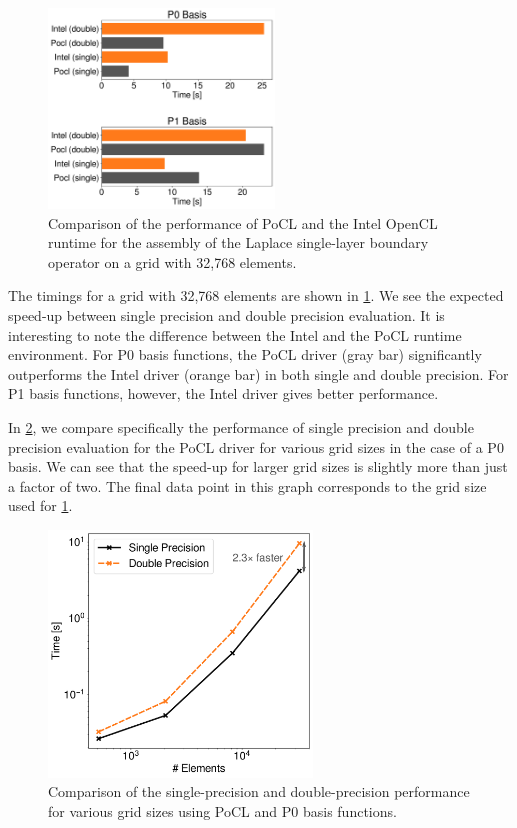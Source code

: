 \begin{figure}
	\center
	\includegraphics[width=6cm]{img/intel_pocl_laplace_comp.pdf}
	\caption{Comparison of the performance of PoCL and the Intel OpenCL runtime for the assembly of the Laplace single-layer boundary operator on a grid with 32,768 elements.}
	\label{fig:intel_pocl_laplace_cmp}
\end{figure}

The timings for a grid with 32,768 elements are shown in \cref{fig:intel_pocl_laplace_cmp}. We see the expected speed-up between single precision and double precision evaluation. It is interesting to note the difference between the Intel and the PoCL runtime environment. For P0 basis functions, the PoCL driver (gray bar) significantly outperforms the Intel driver (orange bar) in both single and double precision. For P1 basis functions, however, the Intel driver gives better performance.

In \cref{fig:pocl_single_layer}, we compare specifically the performance of single precision and double precision evaluation for the PoCL driver for various grid sizes in the case of a P0 basis. We can see that the speed-up for larger grid sizes is slightly more than just a factor of two. The final data point in this graph corresponds to the grid size used for \cref{fig:intel_pocl_laplace_cmp}.

\begin{figure}
	\center
	\includegraphics[width=7cm]{img/pocl_single_layer.pdf}
	\caption{Comparison of the single-precision and double-precision performance for various grid sizes using PoCL and P0 basis functions.}
	\label{fig:pocl_single_layer}
\end{figure}

